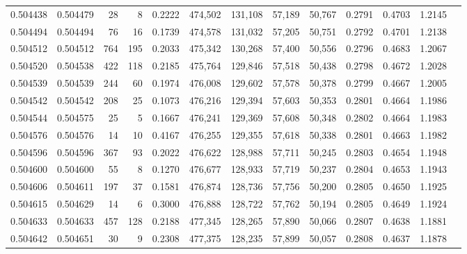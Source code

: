 \begin{tabular}{rrrrrrrrrrrrr}
0.504438 & 0.504479 &    28 &     8 &                                     0.2222 & 474,502 & 131,108 &  57,189 &  50,767 & 0.2791 & 0.4703 & 1.2145 \\
0.504494 & 0.504494 &    76 &    16 &                                     0.1739 & 474,578 & 131,032 &  57,205 &  50,751 & 0.2792 & 0.4701 & 1.2138 \\
0.504512 & 0.504512 &   764 &   195 &                                     0.2033 & 475,342 & 130,268 &  57,400 &  50,556 & 0.2796 & 0.4683 & 1.2067 \\
0.504520 & 0.504538 &   422 &   118 &                                     0.2185 & 475,764 & 129,846 &  57,518 &  50,438 & 0.2798 & 0.4672 & 1.2028 \\
0.504539 & 0.504539 &   244 &    60 &                                     0.1974 & 476,008 & 129,602 &  57,578 &  50,378 & 0.2799 & 0.4667 & 1.2005 \\
0.504542 & 0.504542 &   208 &    25 &                                     0.1073 & 476,216 & 129,394 &  57,603 &  50,353 & 0.2801 & 0.4664 & 1.1986 \\
0.504544 & 0.504575 &    25 &     5 &                                     0.1667 & 476,241 & 129,369 &  57,608 &  50,348 & 0.2802 & 0.4664 & 1.1983 \\
0.504576 & 0.504576 &    14 &    10 &                                     0.4167 & 476,255 & 129,355 &  57,618 &  50,338 & 0.2801 & 0.4663 & 1.1982 \\
0.504596 & 0.504596 &   367 &    93 &                                     0.2022 & 476,622 & 128,988 &  57,711 &  50,245 & 0.2803 & 0.4654 & 1.1948 \\
0.504600 & 0.504600 &    55 &     8 &                                     0.1270 & 476,677 & 128,933 &  57,719 &  50,237 & 0.2804 & 0.4653 & 1.1943 \\
0.504606 & 0.504611 &   197 &    37 &                                     0.1581 & 476,874 & 128,736 &  57,756 &  50,200 & 0.2805 & 0.4650 & 1.1925 \\
0.504615 & 0.504629 &    14 &     6 &                                     0.3000 & 476,888 & 128,722 &  57,762 &  50,194 & 0.2805 & 0.4649 & 1.1924 \\
0.504633 & 0.504633 &   457 &   128 &                                     0.2188 & 477,345 & 128,265 &  57,890 &  50,066 & 0.2807 & 0.4638 & 1.1881 \\
0.504642 & 0.504651 &    30 &     9 &                                     0.2308 & 477,375 & 128,235 &  57,899 &  50,057 & 0.2808 & 0.4637 & 1.1878 \\

\end{tabular}
